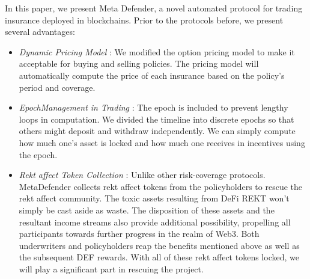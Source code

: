 In this paper, we present Meta Defender, a novel automated protocol for trading insurance deployed in blockchains.
Prior to the protocols before, we present several advantages:

\begin{itemize}
	\item \textit{Dynamic Pricing Model} : We modified the option pricing model to make it acceptable for buying and selling policies.
	The pricing model will automatically compute the price of each insurance based on the policy's period and coverage.
	\item \textit{EpochManagement in Trading} : The epoch is included to prevent lengthy loops in computation.
	We divided the timeline into discrete epochs so that others might deposit and withdraw independently.
	We can simply compute how much one's asset is locked and how much one receives in incentives using the epoch.
	\item \textit{Rekt affect Token Collection} : Unlike other risk-coverage protocols.
	MetaDefender collects rekt affect tokens from the policyholders to rescue the rekt affect community.
	The toxic assets resulting from DeFi REKT won't simply be cast aside as waste.
	The disposition of these assets and the resultant income streams also provide additional possibility, propelling all participants towards further progress in the realm of Web3.
	Both underwriters and policyholders reap the benefits mentioned above as well as the subsequent DEF rewards.
	With all of these rekt affect tokens locked, we will play a significant part in rescuing the project.
\end{itemize}